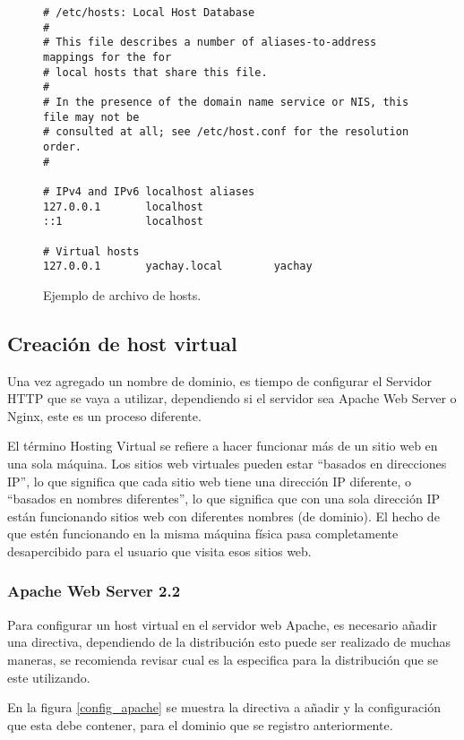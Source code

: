 \begin{figure}
\begin{verbatim}
# /etc/hosts: Local Host Database
#
# This file describes a number of aliases-to-address mappings for the for 
# local hosts that share this file.
#
# In the presence of the domain name service or NIS, this file may not be 
# consulted at all; see /etc/host.conf for the resolution order.
#

# IPv4 and IPv6 localhost aliases
127.0.0.1       localhost
::1             localhost

# Virtual hosts
127.0.0.1       yachay.local        yachay
\end{verbatim}
\caption{Ejemplo de archivo de hosts.}
\label{config_hosts}
\end{figure}

\subsection{Creación de host virtual}
Una vez agregado un nombre de dominio, es tiempo de configurar el Servidor HTTP
que se vaya a utilizar, dependiendo si el servidor sea Apache Web Server o
Nginx, este es un proceso diferente.

El término Hosting Virtual se refiere a hacer funcionar más de un sitio web en
una sola máquina. Los sitios web virtuales pueden estar ``basados en direcciones
IP'', lo que significa que cada sitio web tiene una dirección IP diferente, o
``basados en nombres diferentes'', lo que significa que con una sola dirección
IP están funcionando sitios web con diferentes nombres (de dominio). El hecho de
que estén funcionando en la misma máquina física pasa completamente
desapercibido para el usuario que visita esos sitios web\cite{Apache}.

\subsubsection{Apache Web Server 2.2}
Para configurar un host virtual en el servidor web Apache, es necesario añadir
una directiva, dependiendo de la distribución esto puede ser realizado de muchas
maneras, se recomienda revisar cual es la especifica para la distribución que se
este utilizando.

En la figura \ref{config_apache} se muestra la directiva a añadir y la
configuración que esta debe contener, para el dominio que se registro
anteriormente.

